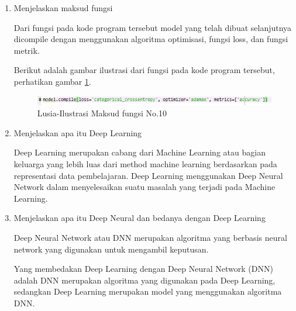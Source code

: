 \begin{enumerate}
\item Menjelaskan maksud fungsi
	
	\par Dari fungsi pada kode program tersebut model yang telah dibuat selanjutnya dicompile dengan menggunakan algoritma optimisasi, fungsi loss, dan fungsi metrik.
	\par Berikut adalah gambar ilustrasi dari fungsi pada kode program tersebut, perhatikan gambar \ref{7A10}.
		\begin{figure}[!hbtp]
		\centering
		\includegraphics[scale=0.4]{figures/v10.jpg}
		\caption{Lusia-Ilustrasi Maksud fungsi No.10}
		\label{7A10}
		\end{figure}

\item Menjelaskan apa itu Deep Learning
	\par Deep Learning merupakan cabang dari Machine Learning atau bagian keluarga yang lebih luas dari method machine learning berdasarkan pada representasi data pembelajaran. Deep Learning menggunakan Deep Neural Network dalam menyelesaikan suatu masalah yang terjadi pada Machine Learning.
	
\item Menjelaskan apa itu Deep Neural dan bedanya dengan Deep Learning
	\par Deep Neural Network atau DNN merupakan algoritma yang berbasis neural network yang digunakan untuk mengambil keputusan.
	\par Yang membedakan Deep Learning dengan  Deep Neural Network (DNN) adalah DNN merupakan algoritma yang digunakan pada Deep Learning, sedangkan Deep Learning merupakan model yang menggunakan algoritma DNN.
	

\end{enumerate}
